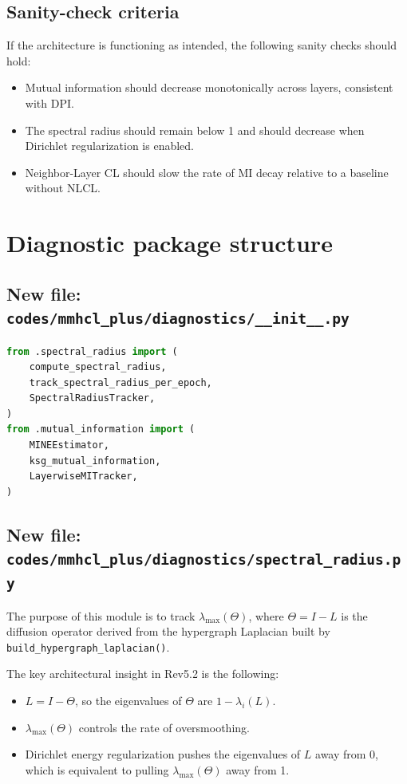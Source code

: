 \documentclass[11pt,a4paper]{article}
\begin{document}
\subsection{Sanity-check criteria}
If the architecture is functioning as intended, the following sanity checks should hold:
\begin{itemize}[leftmargin=1.5em]
\item Mutual information should decrease monotonically across layers, consistent with DPI.
\item The spectral radius should remain below 1 and should decrease when Dirichlet regularization is enabled.
\item Neighbor-Layer CL should slow the rate of MI decay relative to a baseline without NLCL.
\end{itemize}

\section{Diagnostic package structure}
\subsection{New file: \texttt{codes/mmhcl\_plus/diagnostics/\_\_init\_\_.py}}
\begin{lstlisting}[language=Python]
from .spectral_radius import (
    compute_spectral_radius,
    track_spectral_radius_per_epoch,
    SpectralRadiusTracker,
)
from .mutual_information import (
    MINEEstimator,
    ksg_mutual_information,
    LayerwiseMITracker,
)
\end{lstlisting}

\subsection{New file: \texttt{codes/mmhcl\_plus/diagnostics/spectral\_radius.py}}
The purpose of this module is to track \(\lambda_{\max}(\Theta)\), where \(\Theta = I - L\) is the diffusion operator derived from the hypergraph Laplacian built by \texttt{build\_hypergraph\_laplacian()}.

The key architectural insight in Rev5.2 is the following:
\begin{itemize}[leftmargin=1.5em]
\item \(L = I - \Theta\), so the eigenvalues of \(\Theta\) are \(1 - \lambda_i(L)\).
\item \(\lambda_{\max}(\Theta)\) controls the rate of oversmoothing.
\item Dirichlet energy regularization pushes the eigenvalues of \(L\) away from 0, which is equivalent to pulling \(\lambda_{\max}(\Theta)\) away from 1.
\end{itemize}
\end{document}
